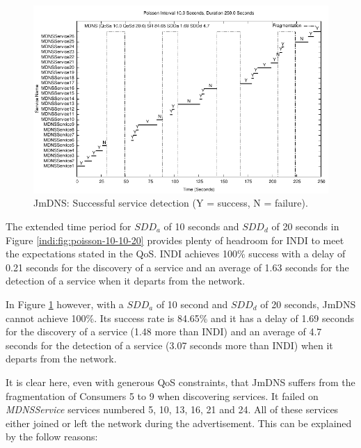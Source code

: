 \begin{figure}[htb]
\centering
\includegraphics[scale=1.0]{jmdns10-10-20-results-distribution.pdf}
\caption{JmDNS: Successful service detection (Y = success, N = failure).} 
\label{jmdns:fig:poisson-10-10-20}
\end{figure}

The extended time period for $SDD_{a}$ of 10 seconds and $SDD_{d}$ of 20 seconds in Figure \ref{indi:fig:poisson-10-10-20} provides plenty of headroom for INDI to meet the expectations stated in the QoS. INDI achieves 100\% success with a delay of 0.21 seconds for the discovery of a service and an average of 1.63 seconds for the detection of a service when it departs from the network.

In Figure \ref{jmdns:fig:poisson-10-10-20} however, with a $SDD_{a}$ of 10 second and $SDD_{d}$ of 20 seconds, JmDNS  cannot achieve 100\%.  Its success rate is 84.65\% and it has a delay of 1.69 seconds for the discovery of a service (1.48 more than INDI) and an average of 4.7 seconds for the detection of a service (3.07 seconds more than INDI) when it departs from the network.

It is clear here, even with generous QoS constraints, that JmDNS suffers from the fragmentation of Consumers 5 to 9 when discovering services. It failed on \emph{MDNSService} services numbered 5, 10, 13, 16, 21 and 24.  All of these services either joined or left the network during the advertisement.  This can be explained by the follow reasons:

